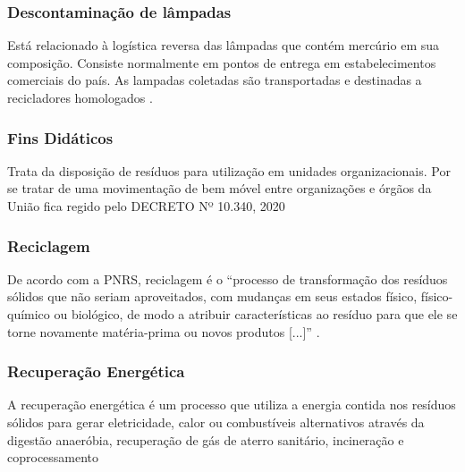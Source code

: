 \subsubsection{Descontaminação de lâmpadas}
Está relacionado à logística reversa das lâmpadas que contém mercúrio em sua composição. Consiste normalmente em pontos de entrega em estabelecimentos comerciais do país. As lampadas coletadas são transportadas e destinadas a recicladores homologados \cite{noauthor_legislacao_2023}.

\subsubsection{Fins Didáticos}

Trata da disposição de resíduos para utilização em unidades organizacionais. Por se tratar de uma movimentação de bem móvel entre organizações e órgãos da União fica regido pelo DECRETO Nº 10.340, 2020 \cite{brasil_decreto_2020}

\subsubsection{Reciclagem} 
De acordo com a \gls{PNRS}, reciclagem é o “processo de transformação dos resíduos sólidos que não seriam aproveitados, com mudanças em seus estados físico, físico-químico ou biológico, de modo a atribuir características ao resíduo para que ele se torne novamente matéria-prima ou novos produtos [...]” \cite[Art 3º, ítem XIV]{brasil_lei_nodate}.

\subsubsection{Recuperação Energética}

A recuperação energética é um processo que utiliza a energia contida nos resíduos sólidos para gerar eletricidade, calor ou combustíveis alternativos através da digestão anaeróbia, recuperação de gás de aterro sanitário, incineração e coprocessamento \cite{abren_abren_2021}

